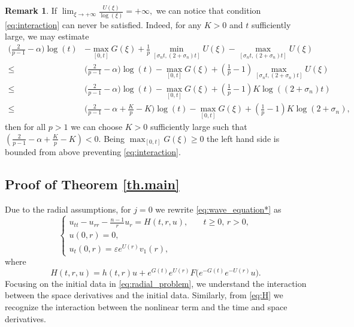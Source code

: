 \documentclass[11pt,reqno]{amsart}
\theoremstyle{definition}
\newtheorem{remark}{Remark}
\numberwithin{equation}{section}
\begin{document}
\begin{remark}
If $\displaystyle{\lim_{\xi \to+\infty}}\frac{U(\xi)}{\log(\xi)}= +\infty,$ we can notice that condition \eqref{eq:interaction} can never be satisfied. Indeed, for any $K>0$ and $t$ sufficiently large, we may estimate
\begin{align*}
\Big(\frac{2}{p-1}-\alpha\Big)\log(t)&-\max_{[0,t]}G(\xi)
    +\frac{1}{p} \min_{[\sigma_n t,(2+\sigma_n)t]} U(\xi) -\max_{[\sigma_n t,(2+\sigma_n)t]} U(\xi) \\ 
\leq &
 \Big(\frac{2}{p-1}-\alpha\Big)\log(t)-\max_{[0,t]}G(\xi)+\left(\frac{1}{p}-1\right)  \max_{[\sigma_n t,(2+\sigma_n)t]} U(\xi)\\
 \leq&
 \Big(\frac{2}{p-1}-\alpha\Big)\log(t)-\max_{[0,t]}G(\xi)+\left(\frac{1}{p}-1\right)  K \log((2+\sigma_n)t)\\
 \leq &\Big(\frac{2}{p-1}-\alpha+\frac{K}{p}-K\Big)\log(t)-\max_{[0,t]}G(\xi)+\left(\frac{1}{p}-1\right)  K \log(2+\sigma_n),
\end{align*}
then for all $p>1$ we can choose $K>0$ sufficiently large such that 
$\left(\frac{2}{p-1}-\alpha+\frac{K}{p}-K\right)<0.$ Being $\displaystyle{\max_{[0,t]} G(\xi)}\geq 0$ 
the left hand side is bounded from above preventing \eqref{eq:interaction}.
%
\end{remark}

\subsection{{ Proof of Theorem \ref{th.main}}}
Due to the radial assumptions, for $j=0$ we rewrite \eqref{eq:wave_equation*} as
\begin{equation}
\label{eq:radial_problem}
\begin{cases}
u_{tt}-u_{rr}-\frac{n-1}{r}u_r=H(t,r,u), \quad &t\geq0,\,r>0,\\
u(0,r)=0,  \\
u_t(0,r)=\varepsilon e^{U(r)} v_1(r),
\end{cases}
\end{equation}
%
where
%
\begin{equation} 
\label{eq:H}
H(t,r,u)=h(t,r)u+e^{G(t)} e^{U(r)}F\Big(e^{-G(t)} e^{-U(r)}u\Big).
\end{equation}
Focusing on the initial data in \eqref{eq:radial_problem}, we understand the interaction between the space derivatives and the initial data. Similarly, from \eqref{eq:H} we recognize the interaction between the nonlinear term and the time and space derivatives.
\end{document}
